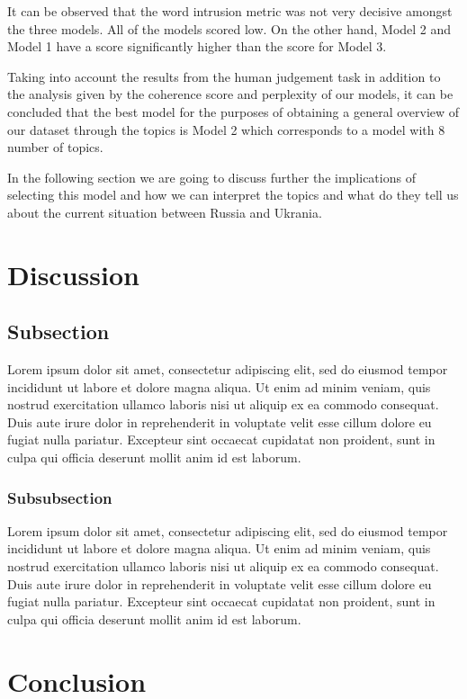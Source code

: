 \documentclass[twoside,12pt,a4paper]{article}
\begin{document}
\hfill \break
It can be observed that the word intrusion metric was not very decisive amongst the three models. All of the models scored low. On the other hand, Model 2 and Model 1 have a score significantly higher than the score for Model 3.

Taking into account the results from the human judgement task in addition to the analysis given by the coherence score and perplexity of our models, it can be concluded that the best model for the purposes of obtaining a general overview of our dataset through the topics is Model 2 which corresponds to a model with 8 number of topics.

In the following section we are going to discuss further the implications of selecting this model and how we can interpret the topics and what do they tell us about the current situation between Russia and Ukrania.

\clearpage
\section{Discussion}
\subsection{Subsection}
Lorem ipsum dolor sit amet, consectetur adipiscing elit, sed do eiusmod tempor incididunt ut labore et dolore magna aliqua. Ut enim ad minim veniam, quis nostrud exercitation ullamco laboris nisi ut aliquip ex ea commodo consequat. Duis aute irure dolor in reprehenderit in voluptate velit esse cillum dolore eu fugiat nulla pariatur. Excepteur sint occaecat cupidatat non proident, sunt in culpa qui officia deserunt mollit anim id est laborum.

\subsubsection{Subsubsection}
Lorem ipsum dolor sit amet, consectetur adipiscing elit, sed do eiusmod tempor incididunt ut labore et dolore magna aliqua. Ut enim ad minim veniam, quis nostrud exercitation ullamco laboris nisi ut aliquip ex ea commodo consequat. Duis aute irure dolor in reprehenderit in voluptate velit esse cillum dolore eu fugiat nulla pariatur. Excepteur sint occaecat cupidatat non proident, sunt in culpa qui officia deserunt mollit anim id est laborum.

\clearpage
\section{Conclusion}
\end{document}
